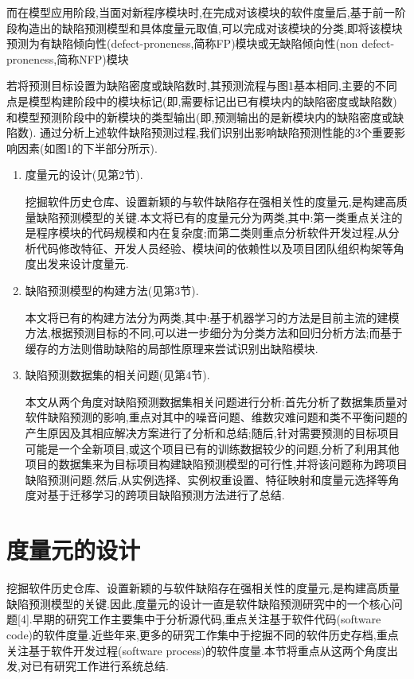 \documentclass{rjthesis}
\begin{document}
	而在模型应用阶段,当面对新程序模块时,在完成对该模块的软件度量后,基于前一阶段构造出的缺陷预测模型和具体度量元取值,可以完成对该模块的分类,即将该模块预测为有缺陷倾向性(defect-proneness,简称FP)模块或无缺陷倾向性(non defect-proneness,简称NFP)模块
	
	若将预测目标设置为缺陷密度或缺陷数时,其预测流程与图1基本相同,主要的不同点是模型构建阶段中的模块标记(即,需要标记出已有模块内的缺陷密度或缺陷数)和模型预测阶段中的新模块的类型输出(即,预测输出的是新模块内的缺陷密度或缺陷数).
	通过分析上述软件缺陷预测过程,我们识别出影响缺陷预测性能的3个重要影响因素(如图1的下半部分所示).
		
		\begin{enumerate}
			\item 度量元的设计(见第2节).
			
			挖掘软件历史仓库、设置新颖的与软件缺陷存在强相关性的度量元,是构建高质量缺陷预测模型的关键.本文将已有的度量元分为两类,其中:第一类重点关注的是程序模块的代码规模和内在复杂度;而第二类则重点分析软件开发过程,从分析代码修改特征、开发人员经验、模块间的依赖性以及项目团队组织构架等角度出发来设计度量元.
			\item 缺陷预测模型的构建方法(见第3节).
			
			本文将已有的构建方法分为两类,其中:基于机器学习的方法是目前主流的建模方法,根据预测目标的不同,可以进一步细分为分类方法和回归分析方法;而基于缓存的方法则借助缺陷的局部性原理来尝试识别出缺陷模块.
			\item 缺陷预测数据集的相关问题(见第4节).
			
			本文从两个角度对缺陷预测数据集相关问题进行分析:首先分析了数据集质量对软件缺陷预测的影响,重点对其中的噪音问题、维数灾难问题和类不平衡问题的产生原因及其相应解决方案进行了分析和总结;随后,针对需要预测的目标项目可能是一个全新项目,或这个项目已有的训练数据较少的问题,分析了利用其他项目的数据集来为目标项目构建缺陷预测模型的可行性,并将该问题称为跨项目缺陷预测问题.然后,从实例选择、实例权重设置、特征映射和度量元选择等角度对基于迁移学习的跨项目缺陷预测方法进行了总结.
		\end{enumerate}
	
	\section{度量元的设计}
	
	挖掘软件历史仓库、设置新颖的与软件缺陷存在强相关性的度量元,是构建高质量缺陷预测模型的关键.因此,度量元的设计一直是软件缺陷预测研究中的一个核心问题[4].早期的研究工作主要集中于分析源代码,重点关注基于软件代码(software code)的软件度量.近些年来,更多的研究工作集中于挖掘不同的软件历史存档,重点关注基于软件开发过程(software process)的软件度量.本节将重点从这两个角度出发,对已有研究工作进行系统总结.
	
\end{document}
